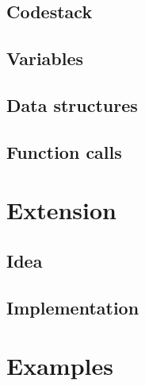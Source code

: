 \documentclass[10pt,a4paper]{article}
\begin{document}
\subsection{Codestack}
\subsection{Variables}
\subsection{Data structures}
\subsection{Function calls}


\section{Extension}
\subsection{Idea}
\subsection{Implementation}



\appendix
\section{Examples}
\end{document}
